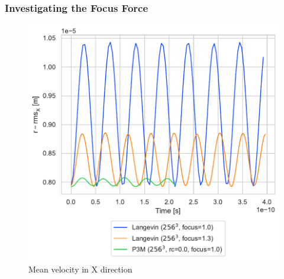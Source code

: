 \documentclass[.08pt,aspectratio=169]{beamer}
\begin{document}
\begin{frame}
\end{frame}

\begin{frame}
    \frametitle{Investigating the Focus Force}

\begin{figure}[!htb]
%
  \includegraphics[width=1.1\linewidth]{figures/rrmsx.pdf}
    \caption{Mean velocity in X direction}
  \label{fig:awesome_image3}
\endminipage
\end{figure}

\end{frame}
\end{document}
